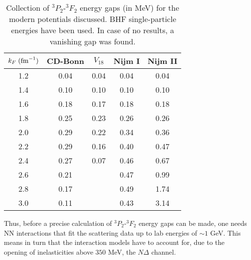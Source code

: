\begin{table}[hbtp]
\begin{center}
\caption{Collection of $^3P_2$-$^3F_2$ energy gaps (in MeV) for the 
modern potentials discussed.  
BHF single-particle energies have been used. In case of no results,
a vanishing gap was found.\label{tab:pgaps}}
\begin{tabular}{ccccc}\hline 
\multicolumn{1}{c}{$k_F\;({\rm fm}^{-1})$}& 
\multicolumn{1}{c}{CD-Bonn}&\multicolumn{1}{c}{$V_{18}$}&
\multicolumn{1}{c}{Nijm I}&\multicolumn{1}{c}{Nijm II} \\ \hline  
     1.2  & 0.04 & 0.04 & 0.04  & 0.04  \\
     1.4  & 0.10 & 0.10 & 0.10  & 0.10  \\
     1.6  & 0.18 & 0.17 & 0.18  & 0.18  \\
     1.8  & 0.25 & 0.23 & 0.26  & 0.26  \\
     2.0  & 0.29 & 0.22 & 0.34  & 0.36  \\
     2.2  & 0.29 & 0.16 & 0.40  & 0.47  \\
     2.4  & 0.27 & 0.07 & 0.46  & 0.67  \\
     2.6  & 0.21 &      & 0.47  & 0.99  \\
     2.8  & 0.17 &      & 0.49  & 1.74  \\
     3.0  & 0.11 &      & 0.43  & 3.14  \\ \hline
\end{tabular}

\end{center}
\end{table} 
Thus, before a precise calculation of $^3P_2$-$^3F_2$ energy gaps
can be made, one needs NN interactions that fit the scattering
data up to lab energies of $\sim 1$ GeV. This means 
in turn that the interaction models have to 
account for, due to the opening
of inelasticities above $350$ MeV, the
$N\Delta$ channel.


